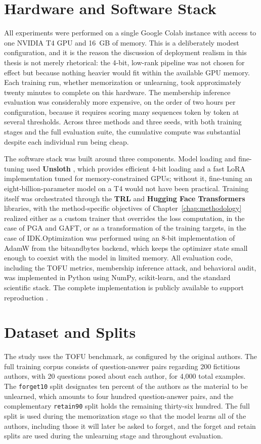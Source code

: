 \documentclass[a4paper,12pt]{report}
\begin{document}
\section{Hardware and Software Stack}
All experiments were performed on a single Google Colab instance with access to one NVIDIA T4 GPU and 16~GB of memory. This is a deliberately modest configuration, and it is the reason the discussion of deployment realism in this thesis is not merely rhetorical: the 4-bit, low-rank pipeline was not chosen for effect but because nothing heavier would fit within the available GPU memory. Each training run, whether memorization or unlearning, took approximately twenty minutes to complete on this hardware. The membership inference evaluation was considerably more expensive, on the order of two hours per configuration, because it requires scoring many sequences token by token at several thresholds. Across three methods and three seeds, with both training stages and the full evaluation suite, the cumulative compute was substantial despite each individual run being cheap.

The software stack was built around three components. Model loading and fine-tuning used \textbf{Unsloth} \parencite{han2023unsloth}, which provides efficient 4-bit loading and a fast LoRA implementation tuned for memory-constrained GPUs; without it, fine-tuning an eight-billion-parameter model on a T4 would not have been practical. Training itself was orchestrated through the \textbf{TRL} and \textbf{Hugging Face Transformers} libraries, with the method-specific objectives of Chapter~\ref{chap:methodology} realized either as a custom trainer that overrides the loss computation, in the case of PGA and GAFT, or as a transformation of the training targets, in the case of IDK.Optimization was performed using an 8-bit implementation of AdamW from the bitsandbytes backend, which keeps the optimizer state small enough to coexist with the model in limited memory. All evaluation code, including the TOFU metrics, membership inference attack, and behavioral audit, was implemented in Python using NumPy, scikit-learn, and the standard scientific stack. The complete implementation is publicly available to support reproduction \parencite{ali2026code}.

\section{Dataset and Splits}
The study uses the TOFU benchmark, as configured by the original authors. The full training corpus consists of question-answer pairs regarding 200 fictitious authors, with 20 questions posed about each author, for 4,000 total examples. The \texttt{forget10} split designates ten percent of the authors as the material to be unlearned, which amounts to four hundred question-answer pairs, and the complementary \texttt{retain90} split holds the remaining thirty-six hundred. The full split is used during the memorization stage so that the model learns all of the authors, including those it will later be asked to forget, and the forget and retain splits are used during the unlearning stage and throughout evaluation.
\end{document}
